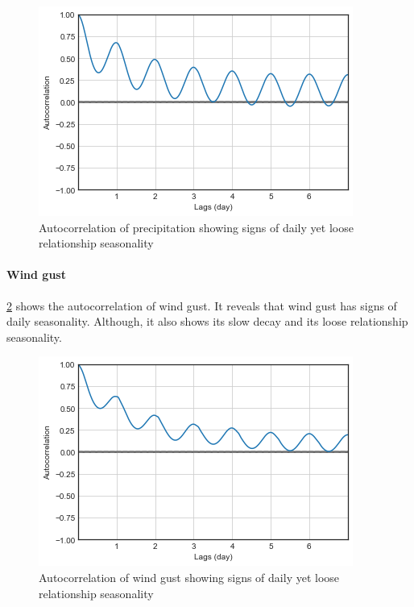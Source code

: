 \begin{figure}
  \includegraphics[width=\linewidth]
  {figures/figure_autocorr_windspeed.png}
  \caption{ Autocorrelation of precipitation showing signs of daily yet loose relationship seasonality}
  \label{figure_autocorr_windspeed}
\end{figure}

\paragraph{Wind gust}

\ref{figure_autocorr_windgust} shows the autocorrelation of wind gust. It reveals that wind gust has signs of daily seasonality. Although, it also shows its slow decay  and its loose relationship seasonality. 

\begin{figure}
  \includegraphics[width=\linewidth]
  {figures/figure_autocorr_windgust.png}
  \caption{ Autocorrelation of wind gust showing signs of daily yet loose relationship seasonality}
  \label{figure_autocorr_windgust}
\end{figure}

